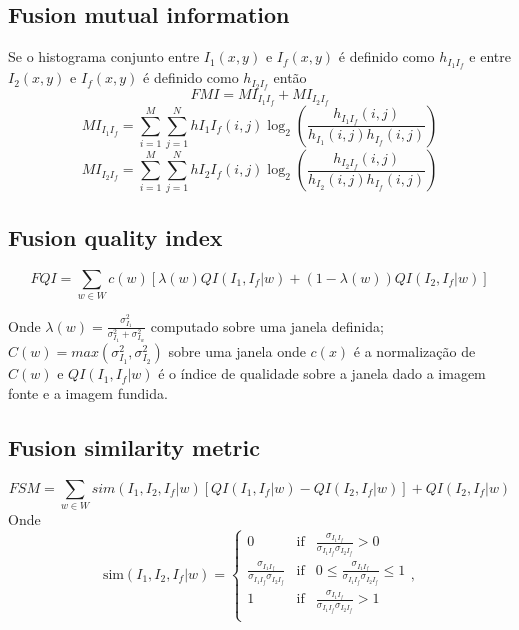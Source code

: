 \subsection{Fusion mutual information}
Se o histograma conjunto entre $I_1(x,y)$ e $I_f(x,y)$ é definido como $h_{I_1I_f}$ e entre $I_2(x,y)$ e $I_f(x,y)$ é definido como $h_{I_2I_f}$ então
\begin{equation}
FMI = MI_{I_1I_f}+MI_{I_2I_f}
\end{equation}
$$MI_{I_1I_f}= \sum_{i=1}^M\sum_{j=1}^N h{I_1I_f}(i,j)\log_2\left(\frac{h_{I_1I_f}(i,j)}{h_{I_1}(i,j)h_{I_f}(i,j)} \right)$$
$$MI_{I_2I_f}= \sum_{i=1}^M\sum_{j=1}^N h{I_2I_f}(i,j)\log_2\left(\frac{h_{I_2I_f}(i,j)}{h_{I_2}(i,j)h_{I_f}(i,j)} \right)$$
\subsection{Fusion quality index}
\begin{equation}
FQI = \sum_{w\in W}c(w)[\lambda(w)QI(I_1,I_f|w)+(1-\lambda(w))QI(I_2,I_f|w)] 
\end{equation}

Onde $\lambda(w)=\frac{\sigma_{I_1}^2}{\sigma_{I_1}^2+\sigma_{I_w}^2}$ computado sobre uma janela definida; $C(w)=max(\sigma_{I_1}^2,\sigma_{I_2}^2)$ sobre uma janela onde $c(x)$ é a normalização de $C(w)$ e $QI(I_1,I_f|w)$ é o índice de qualidade sobre a janela dado a imagem fonte e a imagem fundida.
\subsection{Fusion similarity metric}
\begin{equation}
FSM = \sum_{w\in W} sim(I_1,I_2,I_f|w)[QI(I_1,I_f|w)-QI(I_2,I_f|w)]+QI(I_2,I_f|w) 
\end{equation}
Onde
\begin{equation}
\text{sim}(I_1,I_2,I_f|w) = \left\{
\begin{array}{ccc}
    0   & \text{if} &  \frac{\sigma_{I_1I_f}}{\sigma_{I_1I_f}\sigma_{I_2I_f}} > 0  \\
    \frac{\sigma_{I_1I_f}}{\sigma_{I_1I_f}\sigma_{I_2I_f}}  & \text{if} &  0\le \frac{\sigma_{I_1I_f}}{\sigma_{I_1I_f}\sigma_{I_2I_f}} \le 1  \\
        1   & \text{if} &  \frac{\sigma_{I_1I_f}}{\sigma_{I_1I_f}\sigma_{I_2I_f}} > 1  \\
\end{array}
\right.,
\end{equation}


